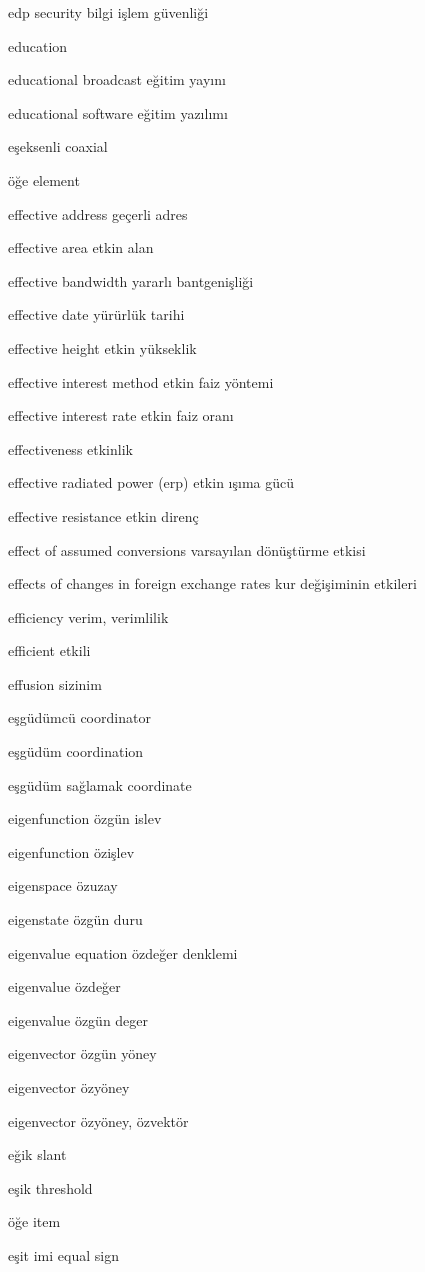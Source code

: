 \documentclass[12pt,fleqn]{article}\usepackage{../../common}
\begin{document}
edp security bilgi işlem güvenliği

education

educational broadcast eğitim yayını

educational software eğitim yazılımı

eşeksenli coaxial

öğe element

effective address geçerli adres

effective area etkin alan

effective bandwidth yararlı bantgenişliği

effective date yürürlük tarihi

effective height etkin yükseklik

effective interest method etkin faiz yöntemi

effective interest rate etkin faiz oranı

effectiveness etkinlik

effective radiated power (erp) etkin ışıma gücü

effective resistance etkin direnç

effect of assumed conversions varsayılan dönüştürme etkisi

effects of changes in foreign exchange rates kur değişiminin etkileri

efficiency verim, verimlilik

efficient etkili

effusion sizinim

eşgüdümcü coordinator

eşgüdüm coordination

eşgüdüm sağlamak coordinate

eigenfunction özgün islev

eigenfunction özişlev

eigenspace özuzay

eigenstate özgün duru

eigenvalue equation özdeğer denklemi

eigenvalue özdeğer

eigenvalue özgün deger

eigenvector özgün yöney

eigenvector özyöney

eigenvector özyöney, özvektör

eğik slant

eşik threshold

öğe item

eşit imi equal sign
\end{document}
